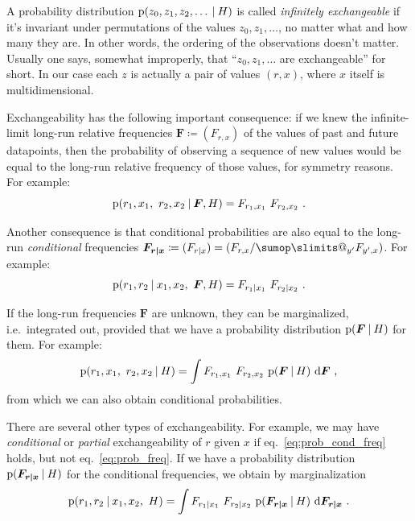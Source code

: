 \documentclass[\ifafour a4paper,12pt,\else a5paper,10pt,\fi%
onecolumn,oneside,article,%
british%
]{memoir}
\makeatletter
\theoremstyle{remark}
\theoremstyle{innote}
\def\sum{\DOTSI\sumop\slimits@}
\newcommand*{\di}{\mathrm{d}}%
\newcommand*{\defd}{\coloneqq}
\newcommand*{\p}{\mathrm{p}}%
\renewcommand*{\|}[1][]{\nonscript\:#1\vert\nonscript\:\mathopen{}}
\renewcommand*{\=}{\TextOrMath\texteq\eq}
\newcommand*{\eqn}{eq.}%
\newcommand*{\ie}{{i.e.}}
\newcommand*{\yF}{\bm{F}}
\newcommand*{\yFrx}{\yF_{\bm{r\mid x}}}
\makeatother
\begin{document}
A probability distribution $\p(z_{0}, z_{1}, z_{2}, \dotsc \| H)$ is called
\emph{infinitely exchangeable} if it's invariant under permutations of the
values $z_{0}, z_{1}, \dotsc$, no matter what and how many they are. In
other words, the ordering of the observations doesn't matter. Usually one
says, somewhat improperly, that \enquote{$z_{0}, z_{1}, \dotsc$ are
  exchangeable} for short. In our case each $z$ is actually a pair of
values $(r,x)$, where $x$ itself is multidimensional.

Exchangeability has the following important consequence: if we knew the
infinite-limit long-run relative frequencies $\yF\defd (F_{r,x})$ of the
values of past and future datapoints, then the probability of observing a
sequence of new values would be equal to the long-run relative frequency of
those values, for symmetry reasons. For example:
\begin{equation}
  \label{eq:prob_freq}
  \p(r_{1},x_{1},\ r_{2},x_{2} \| \yF, H) = F_{r_{1},x_{1}} \ 
  F_{r_{2},x_{2}} \ .
\end{equation}

Another consequence is that conditional probabilities are also equal to the
long-run \emph{conditional} frequencies $\yFrx \defd (F_{r \|x}) =
(F_{r,x}/\sum_{y'}F_{y',x})$. For example:
\begin{equation}
  \label{eq:prob_cond_freq}
  \p(r_{1}, r_{2}\| x_{1}, x_{2},\ \yF, H) = F_{r_{1}\|x_{1}} \ 
  F_{r_{2}\|x_{2}} \ .
\end{equation}

If the long-run frequencies $\yF$ are unknown, they can be marginalized,
\ie\ integrated out, provided that we have a probability distribution
$\p(\yF \| H)$ for them. For example:
\begin{equation}
  \label{eq:prob_freq_integr}
  \p(r_{1},x_{1},\ r_{2},x_{2}\| H) = \int F_{r_{1},x_{1}} \ 
  F_{r_{2},x_{2}} \ \p(\yF \| H)\ \di\yF \ ,
\end{equation}
from which we can also obtain conditional probabilities.

There are several other types of exchangeability. For example, we may have
\emph{conditional} or \emph{partial} exchangeability of $r$ given $x$ if
\eqn~\eqref{eq:prob_cond_freq} holds, but not \eqn~\eqref{eq:prob_freq}. If
we have a probability distribution $\p(\yFrx \| H)$ for the conditional
frequencies, we obtain by marginalization
\begin{equation}
  \label{eq:prob_cond_freq_integr}
  \p(r_{1}, r_{2}\| x_{1}, x_{2},\ H) = \int F_{r_{1}\|x_{1}} \ 
  F_{r_{2}\|x_{2}}\ \p(\yFrx \| H)\ \di\yFrx \ .
\end{equation}
\end{document}
